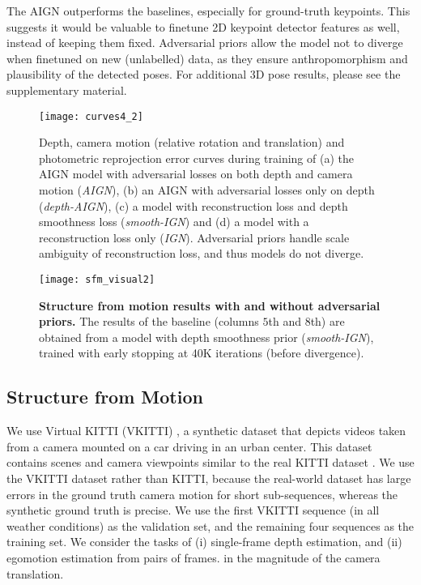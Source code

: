 \documentclass[10pt,twocolumn,letterpaper]{article}
\begin{document}
\begin{bibunit}[ieee]
The AIGN outperforms the baselines, especially for ground-truth keypoints. This suggests it would be valuable to finetune 2D keypoint detector features as well, instead of keeping them fixed. 
Adversarial priors allow the model not to diverge when finetuned on new (unlabelled) data, as they ensure anthropomorphism and plausibility of the detected poses.  For additional 3D pose results, please see the supplementary material.

\begin{figure}[h!]
    \centering
    \texttt{[image: curves4\_2]}
     \centering
    \caption{Depth, camera motion (relative rotation and translation) and  photometric reprojection error curves during training of (a) the AIGN model with adversarial losses on both depth and camera motion (\textit{AIGN}), (b) an AIGN with adversarial losses only on depth (\textit{depth-AIGN}), (c) a model with reconstruction loss and depth smoothness loss (\textit{smooth-IGN}) and (d) a model with a reconstruction loss only (\textit{IGN}). Adversarial priors handle scale ambiguity of reconstruction loss, and thus models do not diverge.}
    \label{fig:training-sfm-difficult}
\end{figure}\begin{figure*}[h!]
    \centering
    \texttt{[image: sfm\_visual2]}
     \centering
    \caption{\textbf{Structure from motion results with and without adversarial priors.} The results of the baseline (columns $5$th and $8$th) are obtained from a model with depth smoothness prior (\textit{smooth-IGN}), trained with early stopping at 40K iterations (before divergence).}
    \label{fig:sfm-visual}
\end{figure*}\subsection{Structure from Motion}
We use Virtual KITTI (VKITTI) \cite{Gaidon:Virtual:CVPR2016}, a synthetic dataset that depicts videos taken from a camera mounted on a car driving in an urban center. This dataset contains scenes and camera viewpoints similar to the real KITTI dataset \cite{Geiger2012CVPR}. We use the VKITTI dataset rather than KITTI, because the real-world dataset has large errors in the ground truth camera motion for short sub-sequences, whereas the synthetic ground truth is precise. %
We use the first VKITTI sequence (in all weather conditions) as the validation set, and the remaining four sequences as the training set.
We consider the tasks of (i) single-frame depth estimation, and (ii) egomotion estimation from pairs of frames. 
in the magnitude of the camera translation. 


\end{bibunit}
\end{document}
